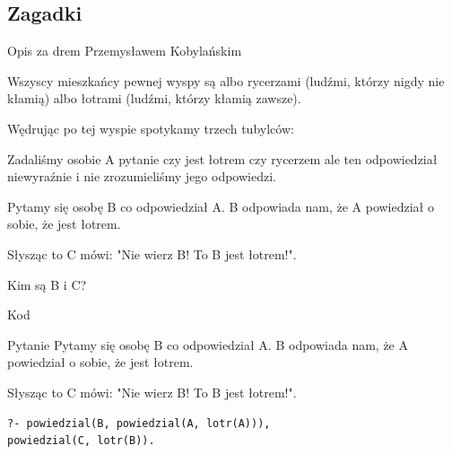 \documentclass[blue]{beamer}
\begin{document}
\subsection{Zagadki}
\begin{frame}{Opis}
za drem Przemysławem Kobylańskim

Wszyscy mieszkańcy pewnej wyspy są albo rycerzami (ludźmi, którzy nigdy nie kłamią) albo łotrami (ludźmi, którzy kłamią zawsze).

Wędrując po tej wyspie spotykamy trzech tubylców:

Zadaliśmy osobie A pytanie czy jest łotrem czy rycerzem ale ten odpowiedział niewyraźnie i nie zrozumieliśmy jego odpowiedzi.

Pytamy się osobę B co odpowiedział A. B odpowiada nam, że A powiedział o sobie, że jest łotrem.

Słysząc to C mówi: "Nie wierz B! To B jest łotrem!".

Kim są B i C? 
\end{frame}
\begin{frame}{Kod}

\end{frame}
\begin{frame}[fragile]{Pytanie}
Pytamy się osobę B co odpowiedział A. B odpowiada nam, że A powiedział o sobie, że jest łotrem.

Słysząc to C mówi: "Nie wierz B! To B jest łotrem!".
\begin{lstlisting}
?- powiedzial(B, powiedzial(A, lotr(A))),
powiedzial(C, lotr(B)).
\end{lstlisting}
\end{frame}
\end{document}
